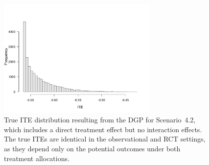 % 



\begin{figure}[htbp]
\centering
\includegraphics[width=0.7\textwidth]{img/results/observ_scenario2_ite_distribution_dgp.png}
\caption{True ITE distribution resulting from the DGP for Scenario~4.2, which includes a direct treatment effect but no interaction effects. The true ITEs are identical in the observational and RCT settings, as they depend only on the potential outcomes under both treatment allocations.}
\label{fig:scenario2_ite_distribution_dgp}
\end{figure}



